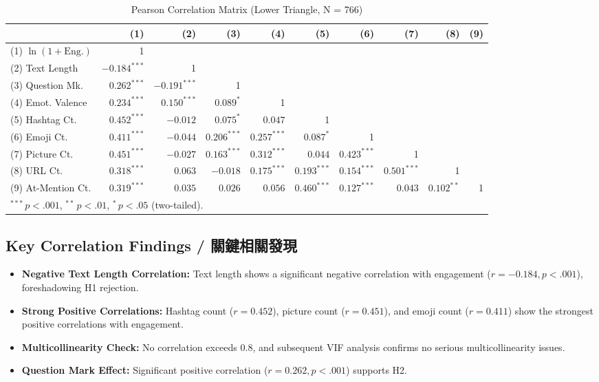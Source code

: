 \documentclass[12pt,a4paper,fontset=none]{ctexart}
\begin{document}
\begin{table}[H]
\centering
\caption{Pearson Correlation Matrix (Lower Triangle, N = 766)}
\label{tab:corr_full}
\small
\setlength{\tabcolsep}{3pt}
\begin{tabular}{lrrrrrrrrr}
\toprule
 & (1) & (2) & (3) & (4) & (5) & (6) & (7) & (8) & (9) \\
\midrule
(1) $\ln(1+\text{Eng.})$ & 1 & & & & & & & & \\
(2) Text Length & $-0.184^{***}$ & 1 & & & & & & & \\
(3) Question Mk. & $0.262^{***}$ & $-0.191^{***}$ & 1 & & & & & & \\
(4) Emot. Valence & $0.234^{***}$ & $0.150^{***}$ & $0.089^{*}$ & 1 & & & & & \\
(5) Hashtag Ct. & $0.452^{***}$ & $-0.012$ & $0.075^{*}$ & $0.047$ & 1 & & & & \\
(6) Emoji Ct. & $0.411^{***}$ & $-0.044$ & $0.206^{***}$ & $0.257^{***}$ & $0.087^{*}$ & 1 & & & \\
(7) Picture Ct. & $0.451^{***}$ & $-0.027$ & $0.163^{***}$ & $0.312^{***}$ & $0.044$ & $0.423^{***}$ & 1 & & \\
(8) URL Ct. & $0.318^{***}$ & $0.063$ & $-0.018$ & $0.175^{***}$ & $0.193^{***}$ & $0.154^{***}$ & $0.501^{***}$ & 1 & \\
(9) At-Mention Ct. & $0.319^{***}$ & $0.035$ & $0.026$ & $0.056$ & $0.460^{***}$ & $0.127^{***}$ & $0.043$ & $0.102^{**}$ & 1 \\
\bottomrule
\multicolumn{10}{l}{\small $^{***}\,p<.001$,\; $^{**}\,p<.01$,\; $^*\,p<.05$ (two-tailed).} \\
\end{tabular}
\end{table}

\subsection{Key Correlation Findings / 關鍵相關發現}

\begin{itemize}
    \item \textbf{Negative Text Length Correlation:} Text length shows a significant negative correlation with engagement ($r = -0.184, p < .001$), foreshadowing H1 rejection.
    \item \textbf{Strong Positive Correlations:} Hashtag count ($r = 0.452$), picture count ($r = 0.451$), and emoji count ($r = 0.411$) show the strongest positive correlations with engagement.
    \item \textbf{Multicollinearity Check:} No correlation exceeds 0.8, and subsequent VIF analysis confirms no serious multicollinearity issues.
    \item \textbf{Question Mark Effect:} Significant positive correlation ($r = 0.262, p < .001$) supports H2.
\end{itemize}
\end{document}
